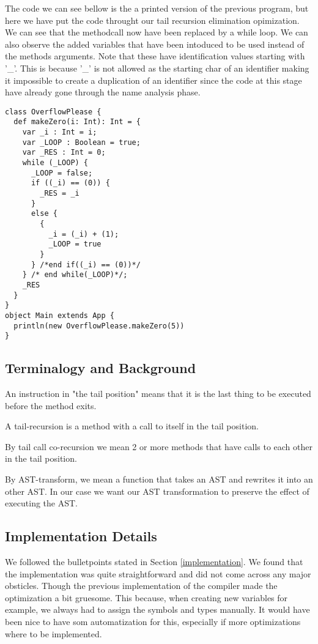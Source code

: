 The code we can see bellow is the a printed version of the previous program, but here we have put the code throught our tail recursion elimination opimization. We can see that the methodcall now have been replaced by a while loop. We can also observe the added variables that have been intoduced to be used instead of the methods arguments. Note that these have identification values starting with '\_'. This is because '\_' is not allowed as the starting char of an identifier making it impossible to create a duplication of an identifier since the code at this stage have already gone through the name analysis phase. 
\begin{lstlisting}
class OverflowPlease {
  def makeZero(i: Int): Int = {
    var _i : Int = i;
    var _LOOP : Boolean = true;
    var _RES : Int = 0;
    while (_LOOP) {
      _LOOP = false;
      if ((_i) == (0)) {
        _RES = _i
      }
      else {
        {
          _i = (_i) + (1);
          _LOOP = true
        }
      } /*end if((_i) == (0))*/
    } /* end while(_LOOP)*/;
    _RES
  }
}
object Main extends App {
  println(new OverflowPlease.makeZero(5)) 
}
\end{lstlisting}



\subsection{Terminalogy and Background}
An instruction in "the tail position" means that it is the last thing to be executed before the method exits.

A tail-recursion is a method with a call to itself in the tail position.

By tail call co-recursion we mean 2 or more methods that have calls to each other in the tail position.

By AST-transform, we mean a function that takes an AST and rewrites it into an other AST. In our case we want our AST transformation to preserve the effect of executing the AST.

\subsection{Implementation Details}
\label{sec:details}
We followed the bulletpoints stated in Section \ref{implementation}. We found that the implementation was quite straightforward and did not 
come across any major obsticles. Though the previous implementation of the compiler made the optimization a bit gruesome. This because, when creating
new variables for example, we always had to assign the symbols and types manually. It would have been nice to have som automatization for this, 
especially if more optimizations where to be implemented.

